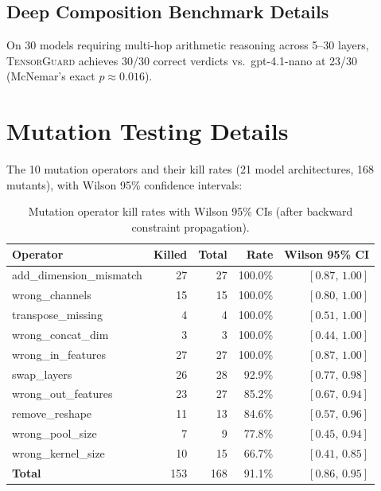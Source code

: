 \documentclass[11pt]{article}
\begin{document}
\subsection{Deep Composition Benchmark Details}\label{sec:deep-comp}

On 30 models requiring multi-hop arithmetic reasoning across
5--30 layers, \textsc{TensorGuard} achieves 30/30 correct verdicts
vs.\ gpt-4.1-nano at 23/30 (McNemar's exact $p \approx 0.016$).


\section{Mutation Testing Details}\label{app:mutation}

The 10 mutation operators and their kill rates (21 model architectures,
168 mutants), with Wilson 95\% confidence intervals:

\begin{table}[h]
\centering
\caption{Mutation operator kill rates with Wilson 95\% CIs
  (after backward constraint propagation).}
\label{tab:mutation-operators}
\small
\begin{tabular}{@{}lrrrr@{}}
\toprule
\textbf{Operator} & \textbf{Killed} & \textbf{Total} & \textbf{Rate} &
  \textbf{Wilson 95\% CI} \\
\midrule
add\_dimension\_mismatch  & 27 & 27 & 100.0\% & $[0.87,\, 1.00]$ \\
wrong\_channels           & 15 & 15 & 100.0\% & $[0.80,\, 1.00]$ \\
transpose\_missing        &  4 &  4 & 100.0\% & $[0.51,\, 1.00]$ \\
wrong\_concat\_dim        &  3 &  3 & 100.0\% & $[0.44,\, 1.00]$ \\
wrong\_in\_features       & 27 & 27 & 100.0\% & $[0.87,\, 1.00]$ \\
swap\_layers              & 26 & 28 &  92.9\% & $[0.77,\, 0.98]$ \\
wrong\_out\_features      & 23 & 27 &  85.2\% & $[0.67,\, 0.94]$ \\
remove\_reshape           & 11 & 13 &  84.6\% & $[0.57,\, 0.96]$ \\
wrong\_pool\_size         &  7 &  9 &  77.8\% & $[0.45,\, 0.94]$ \\
wrong\_kernel\_size       & 10 & 15 &  66.7\% & $[0.41,\, 0.85]$ \\
\midrule
\textbf{Total}            & 153 & 168 & 91.1\% & $[0.86,\, 0.95]$ \\
\bottomrule
\end{tabular}
\end{table}
\end{document}
